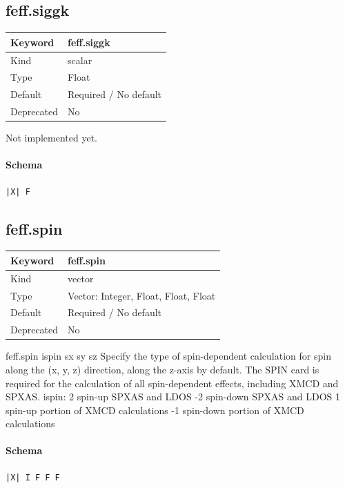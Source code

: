 \documentclass[11pt]{article}
\begin{document}
{{{{\subsection{feff.siggk}
\label{kw:feff-siggk}
\begin{longtable}{|p{1.5in}|p{4.5in}|}
\hline
Keyword & feff.siggk \\
\hline
Kind & scalar \\
\hline
Type & Float \\
\hline
Default & Required / No default \\
\hline
Deprecated & No \\
\hline
\end{longtable}
 Not implemented yet.

\paragraph{Schema}
\begin{Verbatim}
|X| F
\end{Verbatim}

\subsection{feff.spin}
\label{kw:feff-spin}
\begin{longtable}{|p{1.5in}|p{4.5in}|}
\hline
Keyword & feff.spin \\
\hline
Kind & vector \\
\hline
Type & Vector: Integer, Float, Float, Float \\
\hline
Default & Required / No default \\
\hline
Deprecated & No \\
\hline
\end{longtable}
 feff.spin{ ispin sx sy sz }
 Specify the type of spin-dependent calculation for spin along the (x, y, z)
 direction, along the z-axis by default. The SPIN card is required for the
 calculation of all spin-dependent effects, including XMCD and SPXAS.
   ispin:
      2 spin-up SPXAS and LDOS
     -2 spin-down SPXAS and LDOS
      1 spin-up portion of XMCD calculations
     -1 spin-down portion of XMCD calculations

\paragraph{Schema}
\begin{Verbatim}
|X| I F F F
\end{Verbatim}

}}}}
\end{document}
